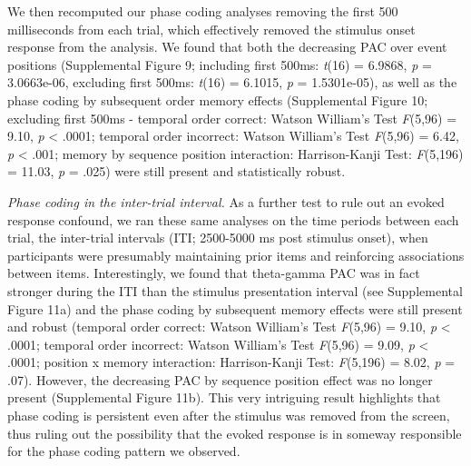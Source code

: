 We then recomputed our phase coding analyses removing the first 500
milliseconds from each trial, which effectively removed the stimulus
onset response from the analysis. We found that both the decreasing PAC
over event positions (Supplemental Figure 9; including first 500ms:
\emph{t}(16) = 6.9868, \emph{p} = 3.0663e-06, excluding first 500ms:
\emph{t}(16) = 6.1015, \emph{p} = 1.5301e-05), as well as the phase
coding by subsequent order memory effects (Supplemental Figure 10;
excluding first 500ms - temporal order correct: Watson William's Test
\emph{F}(5,96) = 9.10, \emph{p} \textless{} .0001; temporal order
incorrect: Watson William's Test \emph{F}(5,96) = 6.42, \emph{p}
\textless{} .001; memory by sequence position interaction:
Harrison-Kanji Test: \emph{F}(5,196) = 11.03, \emph{p} = .025) were
still present and statistically robust.

\emph{Phase coding in the inter-trial interval.} As a further test to
rule out an evoked response confound, we ran these same analyses on the
time periods between each trial, the inter-trial intervals (ITI;
2500-5000 ms post stimulus onset), when participants were presumably
maintaining prior items and reinforcing associations between items.
Interestingly, we found that theta-gamma PAC was in fact stronger during
the ITI than the stimulus presentation interval (see Supplemental Figure
11a) and the phase coding by subsequent memory effects were still
present and robust (temporal order correct: Watson William's Test
\emph{F}(5,96) = 9.10, \emph{p} \textless{} .0001; temporal order
incorrect: Watson William's Test \emph{F}(5,96) = 9.09, \emph{p}
\textless{} .0001; position x memory interaction: Harrison-Kanji Test:
\emph{F}(5,196) = 8.02, \emph{p} = .07). However, the decreasing PAC by
sequence position effect was no longer present (Supplemental Figure
11b). This very intriguing result highlights that phase coding is
persistent even after the stimulus was removed from the screen, thus
ruling out the possibility that the evoked response is in someway
responsible for the phase coding pattern we observed.

